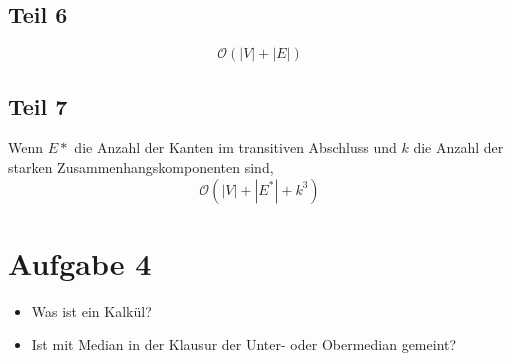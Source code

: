 \documentclass[10pt,a4paper]{article}
\begin{document}
\subsection{Teil 6}

\begin{equation}
  \mathcal{O}(|V| + |E|)
\end{equation}

\subsection{Teil 7}

Wenn $E*$ die Anzahl der Kanten im transitiven Abschluss und $k$ die Anzahl der starken Zusammenhangskomponenten sind,
\begin{equation}
  \mathcal{O}(|V| + |E^{*}| + k^{3})
\end{equation}

\section{Aufgabe 4}

\begin{itemize}
\item Was ist ein Kalkül?
\item Ist mit Median in der Klausur der Unter- oder Obermedian gemeint?
\end{itemize}
\end{document}
